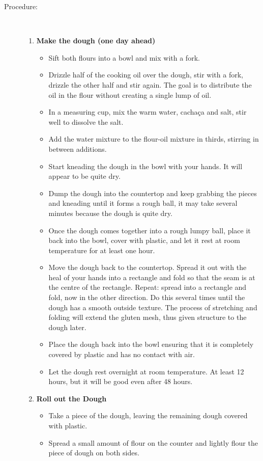 \documentclass[11pt,letterpaper]{article}
\begin{document}
\begin{description}
\item[Procedure:]\ \\
	\begin{enumerate}
	\item {\bf Make the dough (one day ahead)}
	\begin{itemize}
	\item Sift both flours into a bowl and mix with a fork.
	\item Drizzle half of the cooking oil over the dough, stir with a fork, drizzle the other half and stir again. The goal is to distribute the oil in the flour without creating a single lump of oil.
	\item In a measuring cup, mix the warm water, cacha\c{c}a and salt, stir well to dissolve the salt.
	\item Add the water mixture to the flour-oil mixture in thirds, stirring in between additions.
	\item Start kneading the dough in the bowl with your hands. It will appear to be quite dry.
	\item Dump the dough into the countertop and keep grabbing the pieces and kneading until it forms a rough ball, it may take several minutes because the dough is quite dry.
	\item Once the dough comes together into a rough lumpy ball, place it back into the bowl, cover with plastic, and let it rest at room temperature for at least one hour.
	\item Move the dough back to the countertop. Spread it out with the heal of your hands into a rectangle and fold so that the seam is at the centre of the rectangle. Repeat: spread into a rectangle and fold, now in the other direction. Do this several times until the dough has a smooth outside texture. The process of stretching and folding will extend the gluten mesh, thus given structure to the dough later.
	\item Place the dough back into the bowl ensuring that it is completely covered by plastic and has no contact with air. 
	\item Let the dough rest overnight at room temperature. At least 12 hours, but it will be good even after 48 hours.
	\end{itemize}
	\item {\bf Roll out the Dough}
	\begin{itemize}
	\item Take a piece of the dough, leaving the remaining dough covered with plastic.
	\item Spread a small amount of flour on the counter and lightly flour the piece of dough on both sides.

\end{itemize}
\end{enumerate}
\end{description}
\end{document}
